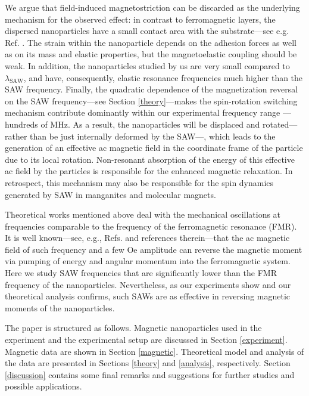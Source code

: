 \documentclass[aps,prb,floats,twocolumn]{revtex4}
\begin{document}
We argue that field-induced magnetostriction can be discarded as the underlying mechanism for the observed effect: in contrast to ferromagnetic layers, the dispersed nanoparticles have a small contact area with the substrate---see e.g. Ref. . The strain within the nanoparticle depends on the adhesion forces as well as on its mass and elastic properties, but the magnetoelastic coupling should be weak. In addition, the nanoparticles studied by us are very small compared to $\lambda_{\textrm{SAW}}$, and have, consequently, elastic resonance frequencies much higher than the SAW frequency. Finally, the quadratic dependence of the magnetization reversal on the SAW frequency---see Section \ref{theory}---makes the spin-rotation switching mechanism contribute dominantly within our experimental frequency range ---hundreds of MHz.\cite{Comm1} As a result, the nanoparticles will be displaced and rotated---rather than be just internally deformed by the SAW---, which leads to the generation of an effective ac magnetic field in the coordinate frame of the particle due to its local rotation.\cite{CJ-2016} Non-resonant absorption of the energy of this effective ac field by the particles is responsible for the enhanced magnetic relaxation. In retrospect, this mechanism may also be responsible for the spin dynamics generated by SAW in manganites \cite{Macia-PRB07} and molecular magnets.\cite{Macia-PRB08}

Theoretical works mentioned above deal with the mechanical oscillations at frequencies comparable to the frequency of the ferromagnetic resonance (FMR). It is well known---see, e.g., Refs.  and references therein---that the ac magnetic field of such frequency and a few Oe amplitude can reverse the magnetic moment via pumping of energy and angular momentum into the ferromagnetic system. Here we study SAW frequencies that are significantly lower than the FMR frequency of the nanoparticles. Nevertheless, as our experiments show and our theoretical analysis confirms, such SAWs are as effective in reversing magnetic moments of the nanoparticles.

The paper is structured as follows. Magnetic nanoparticles used in the experiment and the experimental setup are discussed in Section \ref{experiment}. Magnetic data are shown in Section \ref{magnetic}. Theoretical model and analysis of the data are presented in Sections \ref{theory} and \ref{analysis}, respectively. Section \ref{discussion} contains some final remarks and suggestions for further studies and possible applications.
\end{document}
